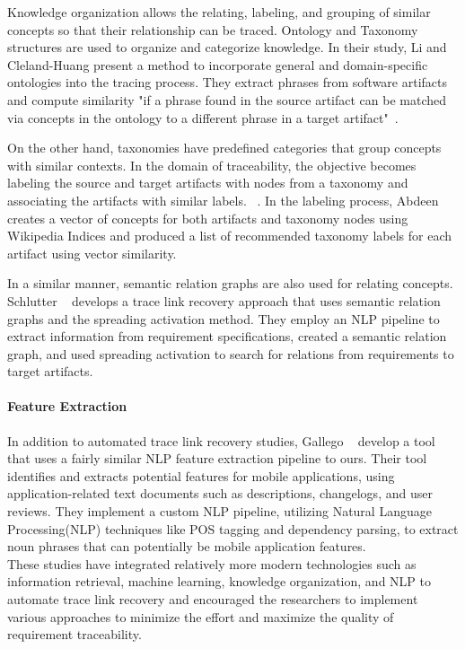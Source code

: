 Knowledge organization allows the relating, labeling, and grouping of similar concepts so that their relationship can be traced. Ontology and Taxonomy structures are used to organize and categorize knowledge.
In their study, Li and Cleland-Huang present a method to incorporate general and domain-specific ontologies into the tracing process. They extract phrases from software artifacts and compute similarity "if a phrase found in the source artifact can be matched via concepts in the ontology to a different phrase in a target
artifact"~\cite{Ontology}.

On the other hand, taxonomies have predefined categories that group concepts with similar contexts. In the domain of traceability, the objective becomes labeling the source and target artifacts with nodes from a taxonomy and associating the artifacts with similar labels. ~\cite{Taxonomy}. In the labeling process, Abdeen ~\cite{abdeen-2023} creates a vector of concepts for both artifacts and taxonomy nodes using Wikipedia Indices and produced a list of recommended taxonomy labels for each artifact using vector similarity.

In a similar manner, semantic relation graphs are also used for relating concepts. Schlutter \etal{} ~\cite{Spreading-Activation} develops a trace link recovery approach that uses semantic relation graphs and the spreading activation method. They employ an NLP pipeline to extract information from requirement specifications, created a semantic relation graph, and used spreading activation to search for relations from requirements to target artifacts.

\paragraph{Feature Extraction}
In addition to automated trace link recovery studies, Gallego \etal{} ~\cite{Marf2023TransFeatExAN} develop a tool that uses a fairly similar NLP feature extraction pipeline to ours. Their tool identifies and extracts potential features for mobile applications, using application-related text documents such as descriptions, changelogs, and user reviews. They implement a custom NLP pipeline, utilizing Natural Language Processing(NLP) techniques like POS tagging and dependency parsing, to extract noun phrases that can potentially be mobile application features.\\

These studies have integrated relatively more modern technologies such as information retrieval, machine learning, knowledge organization, and NLP to automate trace link recovery and encouraged the researchers to implement various approaches to minimize the effort and maximize the quality of requirement traceability.

